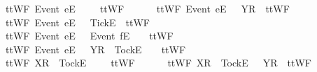 \begin{isabellebody}
\ \ {\isachardoublequoteopen}ttWF{}\ {\isacharparenleft}{\isacharbrackleft}Event\ e{\isacharbrackright}\isactrlsub E\ {\isacharhash}\ {\isasymsigma}{\isacharparenright}\ {\isacharbrackleft}{\isacharbrackright}\ {\isacharequal}\ ttWF{}\ {\isasymsigma}\ {\isacharbrackleft}{\isacharbrackright}{\isachardoublequoteclose}\ {\isacharbar}\ \isanewline
\ \ {\isachardoublequoteopen}ttWF{}\ {\isacharparenleft}{\isacharbrackleft}Event\ e{\isacharbrackright}\isactrlsub E\ {\isacharhash}\ {\isasymsigma}{\isacharparenright}\ {\isacharbrackleft}{\isacharbrackleft}Y{\isacharbrackright}\isactrlsub R{\isacharbrackright}\ {\isacharequal}\ ttWF{}\ {\isasymsigma}\ {\isacharbrackleft}{\isacharbrackright}{\isachardoublequoteclose}\ {\isacharbar}\ \isanewline
\ \ {\isachardoublequoteopen}ttWF{}\ {\isacharparenleft}{\isacharbrackleft}Event\ e{\isacharbrackright}\isactrlsub E\ {\isacharhash}\ {\isasymsigma}{\isacharparenright}\ {\isacharbrackleft}{\isacharbrackleft}Tick{\isacharbrackright}\isactrlsub E{\isacharbrackright}\ {\isacharequal}\ ttWF{}\ {\isasymsigma}\ {\isacharbrackleft}{\isacharbrackright}{\isachardoublequoteclose}\ {\isacharbar}\ \isanewline
\ \ {\isachardoublequoteopen}ttWF{}\ {\isacharparenleft}{\isacharbrackleft}Event\ e{\isacharbrackright}\isactrlsub E\ {\isacharhash}\ {\isasymrho}{\isacharparenright}\ {\isacharparenleft}{\isacharbrackleft}Event\ f{\isacharbrackright}\isactrlsub E\ {\isacharhash}\ {\isasymsigma}{\isacharparenright}\ {\isacharequal}\ ttWF{}\ {\isasymrho}\ {\isasymsigma}{\isachardoublequoteclose}\ {\isacharbar}\ \isanewline
\ \ {\isachardoublequoteopen}ttWF{}\ {\isacharparenleft}{\isacharbrackleft}Event\ e{\isacharbrackright}\isactrlsub E\ {\isacharhash}\ {\isasymrho}{\isacharparenright}\ {\isacharparenleft}{\isacharbrackleft}Y{\isacharbrackright}\isactrlsub R\ {\isacharhash}\ {\isacharbrackleft}Tock{\isacharbrackright}\isactrlsub E\ {\isacharhash}\ {\isasymsigma}{\isacharparenright}\ {\isacharequal}\ ttWF{}\ {\isasymrho}\ {\isasymsigma}{\isachardoublequoteclose}\ {\isacharbar}\ \isanewline
\ \ {\isachardoublequoteopen}ttWF{}\ {\isacharparenleft}{\isacharbrackleft}X{\isacharbrackright}\isactrlsub R\ {\isacharhash}\ {\isacharbrackleft}Tock{\isacharbrackright}\isactrlsub E\ {\isacharhash}\ {\isasymsigma}{\isacharparenright}\ {\isacharbrackleft}{\isacharbrackright}\ {\isacharequal}\ ttWF{}\ {\isasymsigma}\ {\isacharbrackleft}{\isacharbrackright}{\isachardoublequoteclose}\ {\isacharbar}\ \isanewline
\ \ {\isachardoublequoteopen}ttWF{}\ {\isacharparenleft}{\isacharbrackleft}X{\isacharbrackright}\isactrlsub R\ {\isacharhash}\ {\isacharbrackleft}Tock{\isacharbrackright}\isactrlsub E\ {\isacharhash}\ {\isasymsigma}{\isacharparenright}\ {\isacharbrackleft}{\isacharbrackleft}Y{\isacharbrackright}\isactrlsub R{\isacharbrackright}\ {\isacharequal}\ ttWF{}\ {\isasymsigma}\ {\isacharbrackleft}{\isacharbrackright}{\isachardoublequoteclose}\ {\isacharbar}\ \isanewline

\end{isabellebody}
